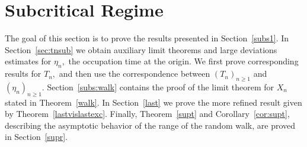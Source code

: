 \documentclass[12pt]{amsart}
\begin{document}
\section{Subcritical Regime}
\label{sec:sub}
The goal of this section is to prove the results presented in
Section~\ref{subs1}. In Section~\ref{sec:tnsub} we obtain auxiliary
limit theorems and large deviations estimates for $\eta_n,$ the
occupation time at the origin.
We first prove corresponding results for $T_n,$ and then use the correspondence
between $(T_n)_{n\geq 1}$ and $(\eta_n)_{n\geq 1}.$
Section~\ref{subs:walk} contains the proof of the limit theorem for $X_n$
stated in Theorem~\ref{walk}. In Section~\ref{last} we prove the more refined result
given by Theorem~\ref{lastvislastexc}. Finally, Theorem~\ref{supt} and
Corollary~\ref{cor:supt}, describing the asymptotic behavior of the range
of the random walk, are proved in Section~\ref{supr}.
\end{document}
